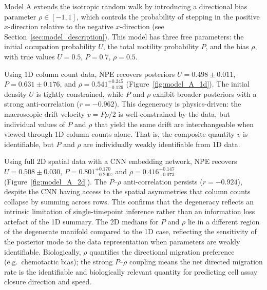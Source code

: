 \documentclass{article}
\begin{document}
Model A extends the isotropic random walk by introducing a directional bias parameter $\rho \in [-1,1]$, which controls the probability of stepping in the positive $x$-direction relative to the negative $x$-direction (see Section~\ref{sec:model_description}). This model has three free parameters: the initial occupation probability $U$, the total motility probability $P$, and the bias $\rho$, with true values $U = 0.5$, $P = 0.7$, $\rho = 0.5$.

Using 1D column count data, NPE recovers posteriors $U = 0.498 \pm 0.011$, $P = 0.631 \pm 0.176$, and $\rho = 0.541^{+0.245}_{-0.129}$ (Figure~\ref{fig:model_A_1d}). The initial density $U$ is tightly constrained, while $P$ and $\rho$ exhibit broader posteriors with a strong anti-correlation ($r = -0.962$). This degeneracy is physics-driven: the macroscopic drift velocity $v = P\rho/2$ is well-constrained by the data, but individual values of $P$ and $\rho$ that yield the same drift are interchangeable when viewed through 1D column counts alone. That is, the composite quantity $v$ is identifiable, but $P$ and $\rho$ are individually weakly identifiable from 1D data.

Using full 2D spatial data with a CNN embedding network, NPE recovers $U = 0.508 \pm 0.030$, $P = 0.801^{+0.170}_{-0.200}$, and $\rho = 0.416^{+0.147}_{-0.073}$ (Figure~\ref{fig:model_A_2d}). The $P$--$\rho$ anti-correlation persists ($r = -0.924$), despite the CNN having access to the spatial asymmetries that column counts collapse by summing across rows. This confirms that the degeneracy reflects an intrinsic limitation of single-timepoint inference rather than an information loss artefact of the 1D summary. The 2D medians for $P$ and $\rho$ lie in a different region of the degenerate manifold compared to the 1D case, reflecting the sensitivity of the posterior mode to the data representation when parameters are weakly identifiable. Biologically, $\rho$ quantifies the directional migration preference (e.g.\ chemotactic bias); the strong $P$--$\rho$ coupling means the net directed migration rate is the identifiable and biologically relevant quantity for predicting cell assay closure direction and speed.
\end{document}
